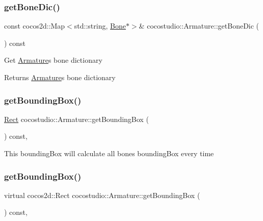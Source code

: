 \subsubsection{\texorpdfstring{get\+Bone\+Dic()}{getBoneDic()}\hspace{0.1cm}{\footnotesize\ttfamily [2/2]}}
{\footnotesize\ttfamily const cocos2d\+::\+Map$<$std\+::string, \hyperlink{classcocostudio_1_1Bone}{Bone}$\ast$$>$\& cocostudio\+::\+Armature\+::get\+Bone\+Dic (\begin{DoxyParamCaption}{ }\end{DoxyParamCaption}) const}

Get \hyperlink{classcocostudio_1_1Armature}{Armature}\textquotesingle{}s bone dictionary \begin{DoxyReturn}{Returns}
\hyperlink{classcocostudio_1_1Armature}{Armature}\textquotesingle{}s bone dictionary 
\end{DoxyReturn}
\mbox{\label{classcocostudio_1_1Armature_a9088f827e4dacfa6b06e86a7d7d0be36}} 
\subsubsection{\texorpdfstring{get\+Bounding\+Box()}{getBoundingBox()}\hspace{0.1cm}{\footnotesize\ttfamily [1/2]}}
{\footnotesize\ttfamily \hyperlink{classRect}{Rect} cocostudio\+::\+Armature\+::get\+Bounding\+Box (\begin{DoxyParamCaption}{ }\end{DoxyParamCaption}) const\hspace{0.3cm}{\ttfamily [override]}, {\ttfamily [virtual]}}

This bounding\+Box will calculate all bones\textquotesingle{} bounding\+Box every time \mbox{\label{classcocostudio_1_1Armature_af7afbacf2d682e65cee5c791c47a68b6}} 
\subsubsection{\texorpdfstring{get\+Bounding\+Box()}{getBoundingBox()}\hspace{0.1cm}{\footnotesize\ttfamily [2/2]}}
{\footnotesize\ttfamily virtual cocos2d\+::\+Rect cocostudio\+::\+Armature\+::get\+Bounding\+Box (\begin{DoxyParamCaption}{ }\end{DoxyParamCaption}) const\hspace{0.3cm}{\ttfamily [override]}, {\ttfamily [virtual]}}

